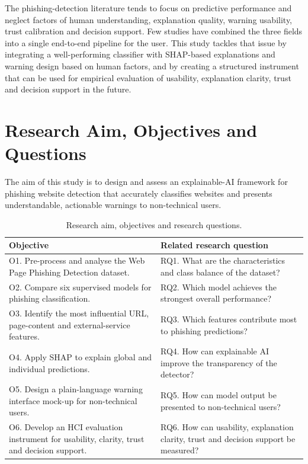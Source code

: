 \documentclass[11pt,a4paper]{article}
\begin{document}
The phishing-detection literature tends to focus on predictive performance and neglect
factors of human understanding, explanation quality, warning usability, trust calibration and
decision support. Few studies have combined the three fields into a single end-to-end pipeline
for the user. This study tackles that issue by integrating a well-performing classifier with
SHAP-based explanations and warning design based on human factors, and by creating a
structured instrument that can be used for empirical evaluation of usability, explanation
clarity, trust and decision support in the future.

\section{Research Aim, Objectives and Questions}

The aim of this study is to design and assess an explainable-AI framework for phishing
website detection that accurately classifies websites and presents understandable, actionable
warnings to non-technical users.

\begin{table}[H]
\caption{Research aim, objectives and research questions.}
\label{tab:objectives}
\centering\footnotesize
\begin{tabularx}{\textwidth}{L L}
\toprule
\textbf{Objective} & \textbf{Related research question} \\
\midrule
O1. Pre-process and analyse the Web Page Phishing Detection dataset. &
RQ1. What are the characteristics and class balance of the dataset? \\
O2. Compare six supervised models for phishing classification. &
RQ2. Which model achieves the strongest overall performance? \\
O3. Identify the most influential URL, page-content and external-service features. &
RQ3. Which features contribute most to phishing predictions? \\
O4. Apply SHAP to explain global and individual predictions. &
RQ4. How can explainable AI improve the transparency of the detector? \\
O5. Design a plain-language warning interface mock-up for non-technical users. &
RQ5. How can model output be presented to non-technical users? \\
O6. Develop an HCI evaluation instrument for usability, clarity, trust and decision support. &
RQ6. How can usability, explanation clarity, trust and decision support be measured? \\
\bottomrule
\end{tabularx}
\end{table}
\end{document}
